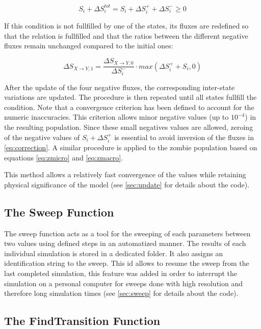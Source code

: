 \documentclass[11pt]{article} %
\begin{document}
\bigskip
\begin{equation} \label{eq:condition}
S_i + \Delta S_i^{tot} = S_i + \Delta S_i^+ + \Delta S_i^- \geq 0
\end{equation}
\bigskip

If this condition is not fullfilled by one of the states, its fluxes are redefined so that the relation is fullfilled and that the ratios between the different negative fluxes remain unchanged compared to the initial ones:

\bigskip
\begin{equation} \label{eq:correction}
\Delta S_{X\rightarrow Y,1} = \frac{\Delta S_{X\rightarrow Y,0}}{\Delta S_i^-}\cdot max(\Delta S_i^+ + S_i, 0)
\end{equation}
\bigskip

After the update of the four negative fluxes, the corresponding inter-state variations are updated. The procedure is then repeated until all states fullfill the condition. Note that a convergence criterion has been defined to account for the numeric inaccuracies. This criterion allows minor negative values (up to $10^{-4}$) in the resulting population. Since these small negatives values are allowed, zeroing of the negative values of $S_i + \Delta S_i^+$ is essential to avoid inversion of the fluxes in \eqref{eq:correction}. A similar procedure is applied to the zombie population based on equations \eqref{eq:zmicro} and \eqref{eq:zmacro}.

This method allows a relatively fast convergence of the values while retaining physical significance of the model (see \ref{sec:update} for details about the code).



\subsection{The Sweep Function}\indent

The sweep function acts as a tool for the sweeping of each parameters between two values using defined steps in an automatized manner. The results of each individual simulation is stored in a dedicated folder. It also assigns an identification string to the sweep. This id allows to resume the sweep from the last completed simulation, this feature was added in order to interrupt the simulation on a personal computer for sweeps done with high resolution and therefore long simulation times (see \ref{sec:sweep} for details about the code).


\subsection{The FindTransition Function}\indent
\label{sec:findTransition}
\end{document}

